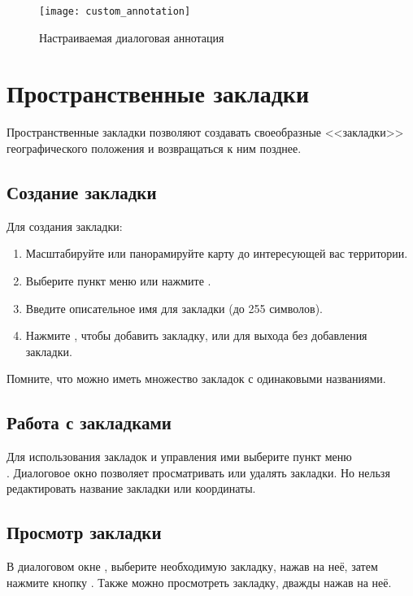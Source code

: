 \begin{figure}[ht]
   \centering
   \texttt{[image: custom\_annotation]}
   \caption{Настраиваемая диалоговая аннотация \wincaption}
   \label{fig:custom-annotations}
\end{figure}

\newpage

\section{Пространственные закладки}\label{sec:bookmarks}

Пространственные закладки позволяют создавать своеобразные <<закладки>>
географического положения и возвращаться к ним позднее.

\subsection{Создание закладки}
Для создания закладки:
\begin{enumerate}
\item Масштабируйте или панорамируйте карту до интересующей вас территории.
\item Выберите пункт меню  \arrow
{} или нажмите .
\item Введите описательное имя для закладки (до 255 символов).
\item Нажмите , чтобы добавить закладку, или 
для выхода без добавления закладки.
\end{enumerate}

Помните, что можно иметь множество закладок с одинаковыми названиями.

\subsection{Работа с закладками}
Для использования закладок и управления ими выберите пункт меню
 \arrow \\ . Диалоговое
окно  позволяет просматривать или удалять
закладки. Но нельзя редактировать название закладки или координаты.

\subsection{Просмотр закладки}
В диалоговом окне , выберите необходимую
закладку, нажав на неё, затем нажмите кнопку . Также
можно просмотреть закладку, дважды нажав на неё.


